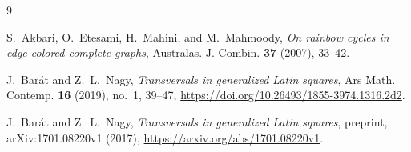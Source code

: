 \documentclass[11pt]{amsart}
\begin{document}
\begin{thebibliography}{9}

S.~Akbari, O.~Etesami, H.~Mahini, and M.~Mahmoody,
\emph{On rainbow cycles in edge colored complete graphs},
Australas. J. Combin. \textbf{37} (2007), 33--42.

J.~Bar\'at and Z.~L.~Nagy,
\emph{Transversals in generalized Latin squares},
Ars Math. Contemp. \textbf{16} (2019), no.~1, 39--47,
\url{https://doi.org/10.26493/1855-3974.1316.2d2}.

J.~Bar\'at and Z.~L.~Nagy,
\emph{Transversals in generalized Latin squares},
preprint, arXiv:1701.08220v1 (2017),
\url{https://arxiv.org/abs/1701.08220v1}.

\end{thebibliography}
\end{document}
